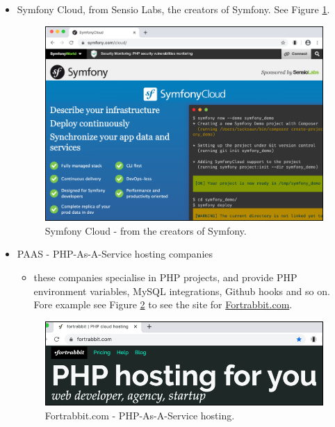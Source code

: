 \documentclass[a4paperpaper,openright]{book}
\providecommand{\tightlist}{%
  \setlength{\itemsep}{0pt}\setlength{\parskip}{0pt}}
\begin{document}
\begin{itemize}
\item
  Symfony Cloud, from Sensio Labs, the creators of Symfony. See Figure
  \ref{sfCloud}.

  \begin{figure}
  \centering
  \includegraphics{./tex2pdf.-05a85d9d563be472/e6bbd8d18c9dc496b3cd41bbb14403128085bed7.png}
  \caption{Symfony Cloud - from the creators of Symfony.\label{sfCloud}}
  \end{figure}
\item
  PAAS - PHP-As-A-Service hosting companies

  \begin{itemize}
  \tightlist
  \item
    these companies specialise in PHP projects, and provide PHP
    environment variables, MySQL integrations, Github hooks and so on.
    Fore example see Figure \ref{paas} to see the site for
    \url{Fortrabbit.com}.
  \end{itemize}

  \begin{figure}
  \centering
  \includegraphics{./tex2pdf.-05a85d9d563be472/705868fe300961a7b7b0974c558cd3a425e1b8ff.png}
  \caption{Fortrabbit.com - PHP-As-A-Service hosting.\label{paas}}
  \end{figure}
\end{itemize}
\end{document}
